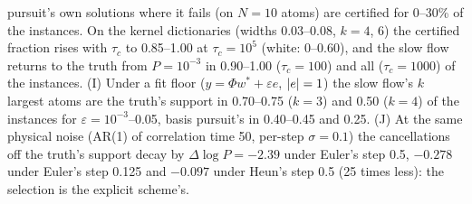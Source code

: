 \begin{sloppypar}
pursuit's own solutions where it fails (on $N = 10$ atoms) are certified for 0--30\% of the instances. On the kernel
dictionaries (widths 0.03--0.08, $k = 4$, 6) the certified fraction rises with $\tau_c$ to 0.85--1.00 at
$\tau_c = 10^5$ (white: 0--0.60), and the slow flow returns to the truth from $P = 10^{-3}$ in 0.90--1.00
($\tau_c = 100$) and all ($\tau_c = 1000$) of the instances. (I) Under a fit floor ($y = \Phi w^* + \varepsilon e$,
$\lvert e\rvert = 1$) the slow flow's $k$ largest atoms are the truth's support in 0.70--0.75 ($k = 3$) and 0.50 ($k = 4$) of the
instances for $\varepsilon = 10^{-3}$--0.05, basis pursuit's in 0.40--0.45 and 0.25. (J) At the same physical noise
(AR(1) of correlation time 50, per-step $\sigma = 0.1$) the cancellations off the truth's support decay by
$\Delta\log P = -2.39$ under Euler's step 0.5, $-0.278$ under Euler's step 0.125 and $-0.097$ under Heun's step 0.5 (25
times less): the selection is the explicit scheme's.
\end{sloppypar}

